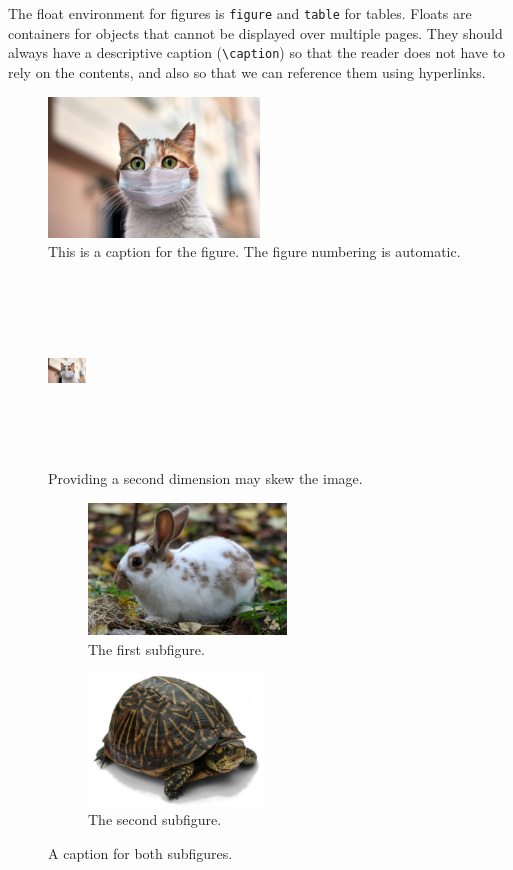\documentclass[11pt, twoside]{article}
\begin{document}
The float environment for figures is \lstinline{figure} and \lstinline{table} for tables.
Floats are containers for objects that cannot be displayed over multiple pages.
They should always have a descriptive caption (\lstinline{\caption}) so that the reader does not have to rely on the contents, and also so that we can reference them using hyperlinks.
\begin{figure}[H]
    \centering
    \includegraphics[width=0.5\textwidth]{figures/cat.jpg}
    \caption{This is a caption for the figure. The figure numbering is automatic.}\label{fig:cat}
\end{figure}
\begin{figure}[H]
    \centering
    \includegraphics[width=1cm,height=5cm]{figures/cat.jpg}
    \caption{Providing a second dimension may skew the image.}
\end{figure}
\begin{figure}[H]
    \centering
    \begin{subfigure}{0.47\textwidth}
        \centering
        \includegraphics[height=3.5cm]{figures/rabbit.jpg}
        \caption{The first subfigure.}
    \end{subfigure}
    \begin{subfigure}{0.47\textwidth}
        \centering
        \includegraphics[height=3.5cm]{figures/turtle.jpg}
        \caption{The second subfigure.}\label{fig:turtle}
    \end{subfigure}
    \caption{A caption for both subfigures.}
\end{figure}
\end{document}
